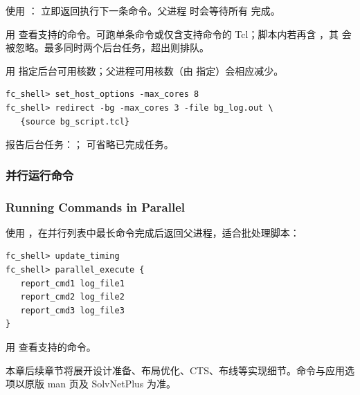使用 ： 立即返回执行下一条命令。父进程  时会等待所有  完成。

用  查看支持的命令。可跑单条命令或仅含支持命令的 Tcl；脚本内若再含 ，其  会被忽略。最多同时两个后台任务，超出则排队。

用  指定后台可用核数；父进程可用核数（由  指定）会相应减少。
\begin{lstlisting}
fc_shell> set_host_options -max_cores 8
fc_shell> redirect -bg -max_cores 3 -file bg_log.out \
   {source bg_script.tcl}
\end{lstlisting}

报告后台任务：； 可省略已完成任务。

\subsubsection{并行运行命令}
\subsubsection*{Running Commands in Parallel}

使用 ，在并行列表中最长命令完成后返回父进程，适合批处理脚本：
\begin{lstlisting}
fc_shell> update_timing
fc_shell> parallel_execute {
   report_cmd1 log_file1
   report_cmd2 log_file2
   report_cmd3 log_file3
}
\end{lstlisting}

用  查看支持的命令。

\begin{seeAlsoBox}
本章后续章节将展开设计准备、布局优化、CTS、布线等实现细节。命令与应用选项以原版 man 页及 SolvNetPlus 为准。
\end{seeAlsoBox}
